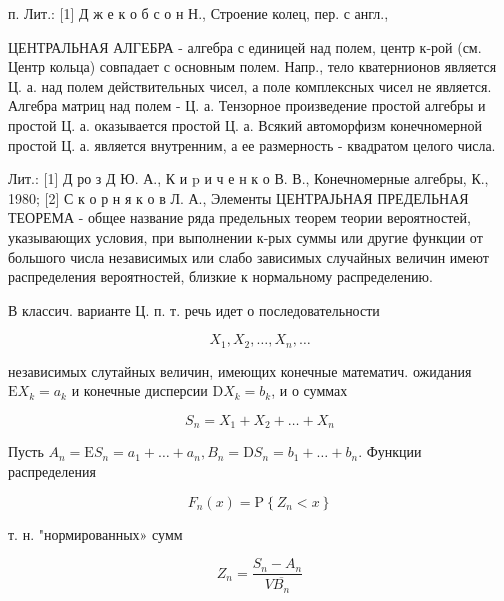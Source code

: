 \documentclass[10pt]{article}
\begin{document}
п. Лит.: [1] Д ж е к о б с о н Н., Строение колец, пер. с англ.,



ЦЕНТРАЛЬНАЯ АЛГЕБРА - алгебра с единицей над полем, центр к-рой (см. Центр кольца) совпадает с основным полем. Напр., тело кватернионов является Ц. а. над полем действительных чисел, а поле комплексных чисел не является. Алгебра матриц над полем - Ц. а. Тензорное произведение простой алгебры и простой Ц. а. оказывается простой Ц. а. Всякий автоморфизм конечномерной простой Ц. а. является внутренним, а ее размерность - квадратом целого числа.



Лит.: [1] Д ро з Д Ю. А., К и $\mathrm{p}$ и ч е н к о В. В., Конечномерные алгебры, К., 1980; [2] С к о р н я к о в Л. А., Элементы ЦЕНТРАЈЬНАЯ ПРЕДЕЛЬНАЯ ТЕОРЕМА - общее название ряда предельных теорем теории вероятностей, указывающих условия, при выполнении к-рых суммы или другие функции от большого числа независимых или слабо зависимых случайных величин имеют распределения вероятностей, близкие к нормальному распределению.



В классич. варианте Ц. п. т. речь идет о последовательности



\[

X_{1}, X_{2}, \ldots, X_{n}, \ldots

\]



независимых слутайных величин, имеющих конечные математич. ожидания $\mathrm{E} X_{k}=a_{k}$ и конечные дисперсии $\mathrm{D} X_{k}=b_{k}$, и о суммах



\[

S_{n}=X_{1}+X_{2}+\ldots+X_{n}

\]



Пусть $A_{n}=\mathrm{E} S_{n}=a_{1}+\ldots+a_{n}, B_{n}=\mathrm{D} S_{n}=b_{1}+\ldots+b_{n}$. Функции распределения



\[

F_{n}(x)=\mathrm{P}\left\{Z_{n}<x\right\}

\]



т. н. "нормированных» сумм



\[

Z_{n}=\frac{S_{n}-A_{n}}{V \overline{B_{n}}}

\]
\end{document}

